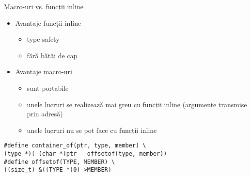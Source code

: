 \documentclass{beamer}
\begin{document}
\begin{frame}{Macro-uri vs. funcții inline}
	\begin{itemize}
		\pause \item Avantaje funcții inline
			\begin{itemize}
				\pause \item type safety
				\pause \item fără bătăi de cap
			\end{itemize}
		\pause \item Avantaje macro-uri
			\begin{itemize}
				\pause \item sunt portabile
				\pause \item unele lucruri se realizează mai greu cu funcții inline
	(argumente transmise prin adresă)
				\pause \item unele lucruri nu se pot face cu funcții inline
			\end{itemize}
	\end{itemize}

	\pause \begin{beamerboxesrounded}[lower=block body,shadow=true]{}
		\texttt{\#define container\_of(ptr, type, member) \textbackslash{} \\
\hlstd{}\hlstd{\ \ \ \ }\hlstd{}(type *)( (char *)ptr -
offsetof(type, member)) \\
\#define offsetof(TYPE, MEMBER) \textbackslash{} \\
\hlstd{}\hlstd{\ \ \ \ }\hlstd{}((size\_t) \&((TYPE *)0)-\textgreater{}MEMBER)
		}
	\end{beamerboxesrounded}

\end{frame}
\end{document}
